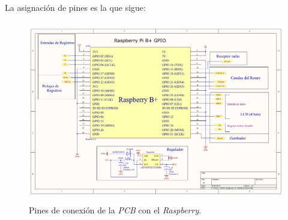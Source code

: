 La asignación de pines es la que sigue:

\smallskip

\begin{figure}[H]
	\noindent \begin{centering}
		\includegraphics[width=\linewidth*2/3]{capitulo3/pcb_gpio}
		\par\end{centering}
	\smallskip
	\caption{\label{fig:pcb_gpio} Pines de conexión de la \textit{PCB} con el \textit{Raspberry}.}
\end{figure} 

\smallskip


